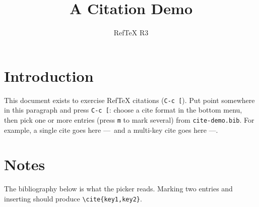 \documentclass{article}
\title{A Citation Demo}
\author{RefTeX R3}
\begin{document}
\maketitle

\section{Introduction}

This document exists to exercise RefTeX citations (\texttt{C-c [}).
Put point somewhere in this paragraph and press \texttt{C-c [}: choose a
cite format in the bottom menu, then pick one or more entries (press
\texttt{m} to mark several) from \texttt{cite-demo.bib}. For example,
a single cite goes here ---\ and a multi-key cite goes here ---.

\section{Notes}

The bibliography below is what the picker reads. Marking two entries and
inserting should produce \verb|\cite{key1,key2}|.



\end{document}

